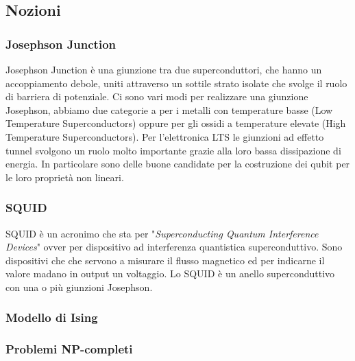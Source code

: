 \subsection{Nozioni}
\subsubsection{Josephson Junction}
Josephson Junction è una giunzione tra due superconduttori, che hanno un accoppiamento debole, uniti attraverso un sottile strato isolate che svolge il ruolo di barriera di potenziale. Ci sono vari modi per realizzare una giunzione Josephson, abbiamo due categorie a per i metalli con temperature basse  (Low Temperature Superconductors) oppure per gli ossidi a temperature elevate  (High Temperature Superconductors). Per l'elettronica LTS le giunzioni ad effetto tunnel svolgono un ruolo molto importante grazie alla loro bassa dissipazione di energia. In particolare sono delle buone candidate per la costruzione dei qubit per le loro proprietà non lineari.

\subsubsection{SQUID}
SQUID è un acronimo che sta per "\textit{Superconducting Quantum Interference Devices}" ovver per dispositivo ad interferenza quantistica superconduttivo. Sono dispositivi che che servono a misurare il flusso magnetico ed per indicarne il valore madano in output un voltaggio. Lo SQUID è un anello superconduttivo con una o più giunzioni Josephson.

\subsubsection{Modello di Ising}

\subsubsection{Problemi NP-completi}
